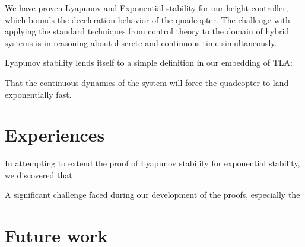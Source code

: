 \documentclass{sigplanconf}
\begin{document}
We have proven Lyapunov and Exponential stability for our height controller, which bounds the deceleration behavior of the quadcopter. The challenge with applying the standard techniques from control theory to the domain of hybrid systems is in reasoning about discrete and continuous time simultaneously.

Lyapunov stability lends itself to a simple definition in our embedding of TLA:


That the continuous dynamics of the system will force the quadcopter to land exponentially fast.





\section {Experiences}          %


In attempting to extend the proof of Lyapunov stability for exponential stability, we discovered that


A significant challenge faced during our development of the proofs, especially the

\section{Future work}






\end{document}
